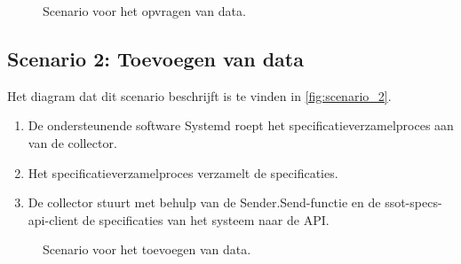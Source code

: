 \documentclass[../views.tex]{subfiles}
\begin{document}
\begin{figure}[ht]
  \centering
  \caption{Scenario voor het opvragen van data.}
  \label{fig:scenario_1}
\end{figure}

\subsection{Scenario 2: Toevoegen van data}

Het diagram dat dit scenario beschrijft is te vinden in \autoref{fig:scenario_2}.

\begin{enumerate}
  \item De ondersteunende software Systemd roept het specificatieverzamelproces aan van de collector.
  \item Het specificatieverzamelproces verzamelt de specificaties.
  \item De collector stuurt met behulp van de Sender.Send-functie en de ssot-specs-api-client de specificaties van het systeem naar de API.
\end{enumerate}

\begin{figure}[ht]
  \centering
  \caption{Scenario voor het toevoegen van data.}
  \label{fig:scenario_2}
\end{figure}
\end{document}
